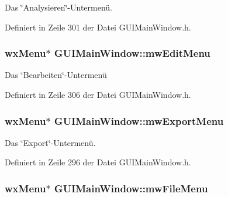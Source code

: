 Das \char`\"{}\-Analysieren\char`\"{}-\/\-Untermenü. 



Definiert in Zeile 301 der Datei G\-U\-I\-Main\-Window.\-h.

\hypertarget{classGUIMainWindow_a32c50be8574176c02aadb47626adc9d4}{
\subsubsection[{mw\-Edit\-Menu}]{\setlength{\rightskip}{0pt plus 5cm}wx\-Menu$\ast$ G\-U\-I\-Main\-Window\-::mw\-Edit\-Menu\hspace{0.3cm}{\ttfamily [private]}}}\label{classGUIMainWindow_a32c50be8574176c02aadb47626adc9d4}


Das \char`\"{}\-Bearbeiten\char`\"{}-\/\-Untermenü 



Definiert in Zeile 306 der Datei G\-U\-I\-Main\-Window.\-h.

\hypertarget{classGUIMainWindow_a9f6af05ef18bf81ff9955670001941ea}{
\subsubsection[{mw\-Export\-Menu}]{\setlength{\rightskip}{0pt plus 5cm}wx\-Menu$\ast$ G\-U\-I\-Main\-Window\-::mw\-Export\-Menu\hspace{0.3cm}{\ttfamily [private]}}}\label{classGUIMainWindow_a9f6af05ef18bf81ff9955670001941ea}


Das \char`\"{}\-Export\char`\"{}-\/\-Untermenü. 



Definiert in Zeile 296 der Datei G\-U\-I\-Main\-Window.\-h.

\hypertarget{classGUIMainWindow_a3b23fa0fb1d779bd5b8384507d8b90e8}{
\subsubsection[{mw\-File\-Menu}]{\setlength{\rightskip}{0pt plus 5cm}wx\-Menu$\ast$ G\-U\-I\-Main\-Window\-::mw\-File\-Menu\hspace{0.3cm}{\ttfamily [private]}}}\label{classGUIMainWindow_a3b23fa0fb1d779bd5b8384507d8b90e8}


